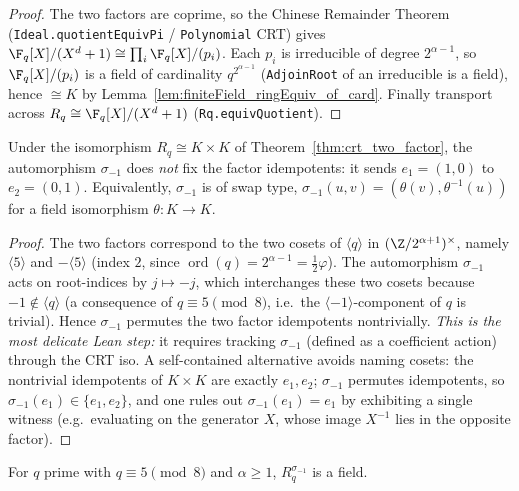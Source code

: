 \begin{proof}
The two factors are coprime, so the Chinese Remainder Theorem
(\texttt{Ideal.quotientEquivPi} / \texttt{Polynomial} CRT) gives
$\F_q[X]/(X^{d}+1) \cong \prod_{i} \F_q[X]/(p_i)$. Each $p_i$ is irreducible of degree
$2^{\alpha-1}$, so $\F_q[X]/(p_i)$ is a field of cardinality $q^{2^{\alpha-1}}$
(\texttt{AdjoinRoot} of an irreducible is a field), hence $\cong K$ by
Lemma~\ref{lem:finiteField_ringEquiv_of_card}. Finally transport across
$R_q \cong \F_q[X]/(X^d+1)$ (\texttt{Rq.equivQuotient}).
\end{proof}

\begin{lemma}\label{lem:conj_swaps}
Under the isomorphism $R_q \cong K \times K$ of Theorem~\ref{thm:crt_two_factor}, the automorphism
$\sigma_{-1}$ does \emph{not} fix the factor idempotents: it sends $e_1 = (1,0)$ to $e_2 = (0,1)$.
Equivalently, $\sigma_{-1}$ is of swap type, $\sigma_{-1}(u,v) = (\theta(v), \theta^{-1}(u))$ for a
field isomorphism $\theta : K \to K$.
\end{lemma}

\begin{proof}
The two factors correspond to the two cosets of $\langle q\rangle$ in $(\Z/2^{\alpha+1})^\times$,
namely $\langle 5\rangle$ and $-\langle 5\rangle$ (index $2$, since $\operatorname{ord}(q) =
2^{\alpha-1} = \tfrac12\varphi$). The automorphism $\sigma_{-1}$ acts on root-indices by $j \mapsto
-j$, which interchanges these two cosets because $-1 \notin \langle q\rangle$ (a consequence of
$q \equiv 5 \pmod 8$, i.e.\ the $\langle -1\rangle$-component of $q$ is trivial). Hence $\sigma_{-1}$
permutes the two factor idempotents nontrivially. \emph{This is the most delicate Lean step:} it
requires tracking $\sigma_{-1}$ (defined as a coefficient action) through the CRT iso. A
self-contained alternative avoids naming cosets: the nontrivial idempotents of $K \times K$ are
exactly $e_1, e_2$; $\sigma_{-1}$ permutes idempotents, so $\sigma_{-1}(e_1) \in \{e_1, e_2\}$, and
one rules out $\sigma_{-1}(e_1) = e_1$ by exhibiting a single witness (e.g.\ evaluating on the
generator $X$, whose image $X^{-1}$ lies in the opposite factor).
\end{proof}

\begin{theorem}\label{thm:conjFixedSubring_isField}
For $q$ prime with $q \equiv 5 \pmod 8$ and $\alpha \ge 1$, $R_q^{\sigma_{-1}}$ is a field.
\end{theorem}

